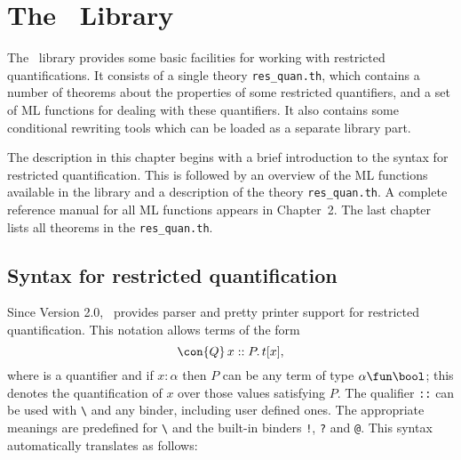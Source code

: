 
\chapter{The \resquan\ Library}

The \resquan\ library provides some basic facilities for working with
restricted quantifications. It consists of a single theory \verb|res_quan.th|,
which contains a number of theorems about the properties of some
restricted quantifiers, and a set of ML functions for dealing with
these quantifiers. It also contains some conditional
rewriting tools which can be loaded as a separate library part.

The description in this chapter begins with a brief introduction to
the syntax for restricted quantification. This is followed by an
overview of the ML functions available in the library and a
description of the theory \verb|res_quan.th|. A complete reference
manual for all ML functions appears in Chapter~2. The last chapter
lists all theorems in the \verb|res_quan.th|.

\section{Syntax for restricted quantification}

Since Version 2.0, \HOL\ provides parser and pretty printer support
for restricted quantification. This notation allows terms of the form
\[
\con{Q}\,x ::P.\, t[x],
\]
where  is a quantifier and
if $x:\alpha$ then $P$ can be any term of type $\alpha\fun\bool$; this
denotes the quantification of $x$ over those values satisfying $P$.
The qualifier {\small\verb|::|} can be used with {\small\verb|\|} and any
binder, including user defined ones. The appropriate meanings are
predefined for {\small\verb|\|} and the built-in binders
{\small\verb|!|}, {\small\verb|?|} and {\small\verb|@|}.
This syntax automatically translates as follows:

\begin{hol}
{\small\verb%   \%}$v${\small\verb%::%}$P${\small\verb%.%}$tm${\small\verb%    <---->   %}\con{RES\_ABSTRACT}\ $P${\small\verb% (\%}$v${\small\verb%.%}$tm${\small\verb%)%}\\
{\small\verb%   !%}$v${\small\verb%::%}$P${\small\verb%.%}$tm${\small\verb%    <---->   %}\con{RES\_FORALL}\ \ \ $P${\small\verb% (\%}$v${\small\verb%.%}$tm${\small\verb%)%}\\
{\small\verb%   ?%}$v${\small\verb%::%}$P${\small\verb%.%}$tm${\small\verb%    <---->   %}\con{RES\_EXISTS}\ \ \ $P${\small\verb% (\%}$v${\small\verb%.%}$tm${\small\verb%)%}\\
{\small\verb%   @%}$v${\small\verb%::%}$P${\small\verb%.%}$tm${\small\verb%    <---->   %}\con{RES\_SELECT}\ \ \ $P${\small\verb% (\%}$v${\small\verb%.%}$tm${\small\verb%)%}
\end{hol}

